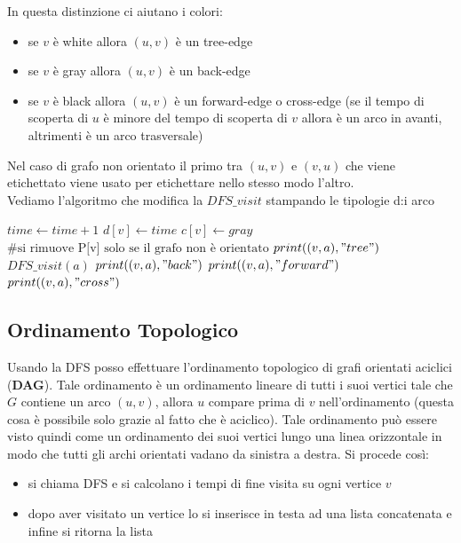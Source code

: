 \documentclass[a4paper,12pt, oneside]{book}
\begin{document}
In questa distinzione ci aiutano i colori:
\begin{itemize}
  \item se $v$ è white allora $(u, v)$ è un tree-edge
  \item se $v$ è gray allora $(u, v)$ è un back-edge
  \item se $v$ è black allora $(u, v)$ è un forward-edge o cross-edge
  (se il tempo di scoperta di $u$ è minore del tempo di scoperta di
  $v$ allora è un arco in avanti, altrimenti è un arco trasversale)
\end{itemize}
Nel caso di grafo non orientato il primo tra $(u,v)$ e $(v,u)$ che
viene etichettato viene usato per etichettare nello stesso modo
l'altro.\\ Vediamo l'algoritmo che modifica la $DFS\_visit$ stampando
le tipologie d:i arco
\begin{algorithm}
  \begin{algorithmic}
    \State $time \gets time+1$
    \State $d[v]\gets time$
    \State $c[v]\gets gray$
    \State $\mbox{\#si rimuove P[v] solo se il grafo non è orientato}$
    \State $print((v,a), "tree")$
    \State $DFS\_visit(a)$
    \State $print((v,a), "back")$
    \State $print((v,a), "forward")$
    \Else
    \State $print((v,a), "cross")$
    \EndIf
    \EndIf
    \EndFor
    \EndFunction
  \end{algorithmic}
\end{algorithm}

\subsection{Ordinamento Topologico}
Usando la DFS posso effettuare l'ordinamento topologico di grafi
orientati aciclici (\textbf{DAG}). Tale ordinamento è un ordinamento
lineare di tutti i suoi vertici tale che $G$ contiene un arco $(u,v)$,
allora $u$ compare prima di $v$ nell'ordinamento (questa cosa è
possibile solo grazie al fatto che è aciclico). Tale ordinamento può
essere visto quindi come un ordinamento dei suoi vertici lungo una
linea orizzontale in modo che tutti gli archi orientati vadano da
sinistra a destra. Si procede così:
\begin{itemize}
  \item si chiama DFS e si calcolano i tempi di fine visita su ogni
  vertice $v$
  \item dopo aver visitato un vertice lo si inserisce in testa ad una
  lista concatenata e infine si ritorna la lista
\end{itemize}
\end{document}
